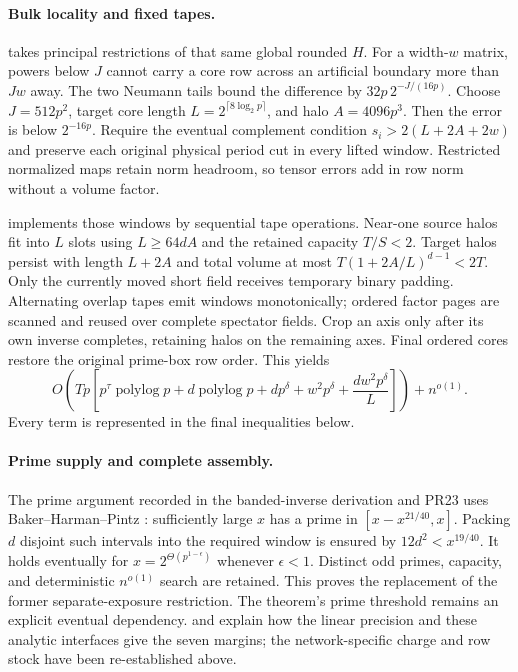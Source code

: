 \paragraph{Bulk locality and fixed tapes.}
 takes principal restrictions
of that same global rounded $H$. For a width-$w$ matrix, powers below
$J$ cannot carry a core row across an artificial boundary more than
$Jw$ away. The two Neumann tails bound the difference by
$32p\,2^{-J/(16p)}$. Choose $J=512p^2$, target core length
$L=2^{\lceil8\log_2p\rceil}$, and halo $A=4096p^3$.
Then the error is below $2^{-16p}$. Require the eventual complement
condition $s_i>2(L+2A+2w)$ and preserve each original physical period
cut in every lifted window. Restricted normalized maps retain norm
headroom, so tensor errors add in row norm without a volume factor.

 implements those windows by
sequential tape operations. Near-one source halos fit into $L$ slots
using $L\ge64dA$ and the retained capacity $T/S<2$.
Target halos persist with length $L+2A$ and total volume at most
$T(1+2A/L)^{d-1}<2T$. Only the currently moved short field receives
temporary binary padding. Alternating overlap tapes emit windows
monotonically; ordered factor pages are scanned and reused over
complete spectator fields. Crop an axis only after its own inverse
completes, retaining halos on the remaining axes. Final ordered cores
restore the original prime-box row order. This yields
\[
 O\!\left(Tp\left[p^\tau\operatorname{polylog}p
 +d\operatorname{polylog}p+dp^\delta+w^2p^\delta
 +\frac{dw^2p^\delta}{L}\right]\right)+n^{o(1)}.
\]
Every term is represented in the final inequalities below.

\paragraph{Prime supply and complete assembly.}
The prime argument recorded in the banded-inverse derivation and PR23
uses Baker--Harman--Pintz \cite{bhp}: sufficiently large $x$ has a prime
in $[x-x^{21/40},x]$. Packing $d$ disjoint such intervals into the
required window is ensured by $12d^2<x^{19/40}$. It holds eventually
for $x=2^{\Theta(p^{1-\epsilon})}$ whenever $\epsilon<1$.
Distinct odd primes, capacity, and deterministic $n^{o(1)}$ search are
retained. This proves the replacement of the former separate-exposure
restriction. The theorem's prime threshold remains an explicit eventual
dependency.  and
 explain how the linear
precision and these analytic interfaces give the seven margins; the
network-specific charge and row stock have been re-established above.

